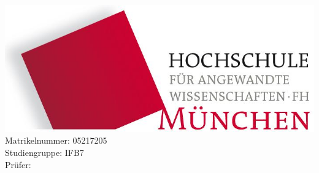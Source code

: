 \begin{titlepage}
	\begin{addmargin}[-1cm]{-3cm}
    \begin{center}
        \large  

        \hfill

        \vfill

        \begingroup
            \color{Maroon}\spacedallcaps{\myTitle} \bigskip \\ 
            \bigskip
        \endgroup

        \spacedlowsmallcaps{\myName} \medskip \\ 
		\spacedlowsmallcaps{\myTime}
		
        \vfill
        \includegraphics[width=0.4\linewidth]{images/hm_logo} \\
        
		\vfill
		Matrikelnummer: 05217205 \\
		Studiengruppe: IFB7 \\ \bigskip
		Prüfer: \myProf \\ 
		\vfill
        \myDegree \\    
        \myFaculty
        \vfill
        \myUni
    \end{center}  
  \end{addmargin}       
\end{titlepage}   